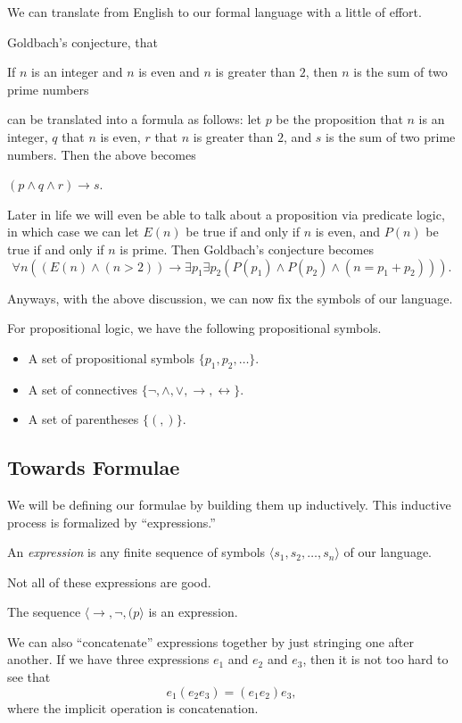 \documentclass[../notes.tex]{subfiles}
\begin{document}
We can translate from English to our formal language with a little of effort.
\begin{example}
	Goldbach's conjecture, that
	\begin{center}
		If $n$ is an integer and $n$ is even and $n$ is greater than $2$, then $n$ is the sum of two prime numbers
	\end{center}
	can be translated into a formula as follows: let $p$ be the proposition that $n$ is an integer, $q$ that $n$ is even, $r$ that $n$ is greater than $2$, and $s$ is the sum of two prime numbers. Then the above becomes
	\begin{center}
		$(p\land q\land r)\to s$.
	\end{center}
\end{example}
\begin{remark}
	Later in life we will even be able to talk about a proposition via predicate logic, in which case we can let $E(n)$ be true if and only if $n$ is even, and $P(n)$ be true if and only if $n$ is prime. Then Goldbach's conjecture becomes
	\[\forall n((E(n)\land(n>2))\to\exists p_1\exists p_2(P(p_1)\land P(p_2)\land(n=p_1+p_2))).\]
\end{remark}
Anyways, with the above discussion, we can now fix the symbols of our language.
\begin{defi}[Symbols]
	For propositional logic, we have the following propositional symbols.
	\begin{itemize}
		\item A set of propositional symbols $\{p_1,p_2,\ldots\}$.
		\item A set of connectives $\{\lnot,\land,\lor,\to,\leftrightarrow\}$.
		\item A set of parentheses $\{(,)\}$.
	\end{itemize}
\end{defi}

\subsection{Towards Formulae}
We will be defining our formulae by building them up inductively. This inductive process is formalized by ``expressions.''
\begin{definition}[Expression]
	An \textit{expression} is any finite sequence of symbols $\langle s_1,s_2,\ldots,s_n\rangle$ of our language.
\end{definition}
Not all of these expressions are good.
\begin{example}
	The sequence $\langle\to,\lnot,(p\rangle$ is an expression.
\end{example}
We can also ``concatenate'' expressions together by just stringing one after another. If we have three expressions $e_1$ and $e_2$ and $e_3$, then it is not too hard to see that
\[e_1(e_2e_3)=(e_1e_2)e_3,\]
where the implicit operation is concatenation.
\end{document}
